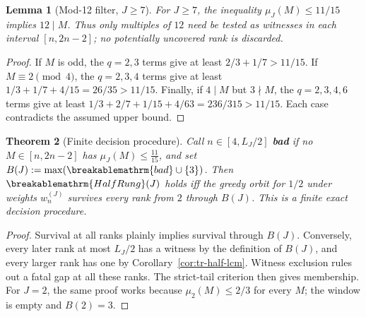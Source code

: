 \documentclass[11pt]{article}
\theoremstyle{plain}
\newtheorem{thm}{Theorem}[section]
\newtheorem{lem}[thm]{Lemma}
\theoremstyle{definition}
\theoremstyle{remark}
\renewcommand{\mathrm}[1]{\ifmmode\breakablemathrm{#1}\else\textrm{#1}\fi}%
\begin{document}
\begin{lem}[Mod-12 filter, $J\ge7$]
\label{lem:tr-mod12}
For $J\ge7$, the inequality $\mu_J(M)\le11/15$ implies $12\mid M$.
Thus only multiples of $12$ need be tested as witnesses in each interval
$[n,2n-2]$; no potentially uncovered rank is discarded.
\end{lem}
\begin{proof}
If $M$ is odd, the $q=2,3$ terms give at least $2/3+1/7>11/15$.
If $M\equiv2\pmod4$, the $q=2,3,4$ terms give at least
$1/3+1/7+4/15=26/35>11/15$.  Finally, if $4\mid M$ but $3\nmid M$,
the $q=2,3,4,6$ terms give at least
$1/3+2/7+1/15+4/63=236/315>11/15$.
Each case contradicts the assumed upper bound.
\end{proof}

\begin{thm}[Finite decision procedure]
\label{thm:tr-finite-decision}
Call $n\in[4,L_J/2]$ \textbf{bad} if no $M\in[n,2n-2]$ has $\mu_J(M)\le\tfrac{11}{15}$, and set
$B(J):=\max(\mathrm{bad}\cup\{3\})$. Then $\mathrm{HalfRung}(J)$ holds iff the greedy orbit for
$1/2$ under weights $w_n^{(J)}$ survives every rank from $2$ through
$B(J)$.  This is a finite exact decision procedure.
\end{thm}
\begin{proof}
Survival at all ranks plainly implies survival through $B(J)$.
Conversely, every later rank at most $L_J/2$ has a witness by the
definition of $B(J)$, and every larger rank has one by
Corollary~\ref{cor:tr-half-lcm}.  Witness exclusion rules out a fatal gap
at all these ranks.  The strict-tail criterion then gives membership.
For $J=2$, the same proof works because $\mu_2(M)\le2/3$ for every $M$;
the window is empty and $B(2)=3$.
\end{proof}
\end{document}
